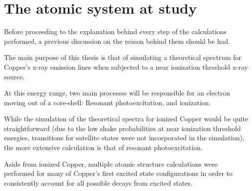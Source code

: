 % 
%  


\section{The atomic system at study}

Before proceeding to the explanation behind every step of the calculations performed, a previous discussion on the reason behind them should be had.


The main purpose of this thesis is that of simulating a theoretical spectrum for Copper's x-ray emission lines when subjected to a near ionization threshold x-ray source.

At this energy range, two main processes will be responsible for an electron moving out of a core-shell: Resonant photoexcitation, and ionization.

While the simulation of the theoretical spectra for ionized Copper would be quite straightforward (due to the low shake probabilities at near ionization threshold energies, transitions for satellite states were not incorporated in the simulation), the more extensive calculation is that of resonant photoexcitation.

Aside from ionized Copper, multiple atomic structure calculations were performed for many of Copper's first excited state configurations in order to consistently account for all possible decays from excited states.

